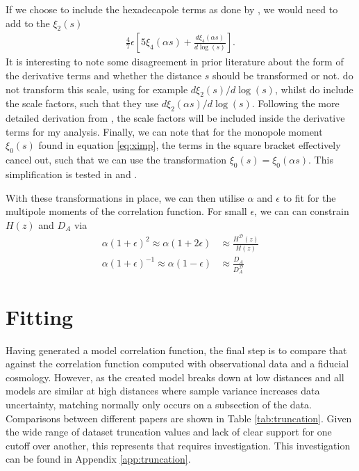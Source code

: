 \documentclass[titlesmallcaps, examinerscopy, copyrightpage]{uqthesis}
\begin{document}
If we choose to include the hexadecapole terms as done by \citet{XuCuesta2013}, we would need to add to the $\xi_2(s)$ 
\begin{align}
\frac{4}{7}\epsilon \left[ 5 \xi_4 (\alpha s) + \frac{d \xi_4(\alpha s)}{d \log(s)} \right].
\end{align}
It is interesting to note some disagreement in prior literature about the form of the derivative terms and whether the distance $s$ should be transformed or not. \citet{KazinSanchezBlanton2012} do not transform this scale, using for example $d\xi_2(s)/d\log(s)$, whilst \citet{XuCuesta2013} do include the scale factors, such that they use $d\xi_2(\alpha s) / d\log(s)$. Following the more detailed derivation from \citet{XuCuesta2013}, the scale factors will be included inside the derivative terms for my analysis. Finally, we can note that for the monopole moment $\xi_0(s)$ found in equation \eqref{eq:ximp}, the terms in the square bracket effectively cancel out, such that we can use the transformation $\xi_0(s) = \xi_0(\alpha s)$. This simplification is tested in \citet{Sanchez2009} and \citet{EisensteinZehavi2005}.

With these transformations in place, we can then utilise $\alpha$ and $\epsilon$ to fit for the multipole moments of the correlation function. For small $\epsilon$, we can can constrain $H(z)$ and $D_A$ via
\begin{align}
\alpha(1 + \epsilon)^2 \approx \alpha(1 + 2\epsilon) &\approx \frac{H^\mathcal{D}(z)}{H(z)} \label{eq:alpha1}\\
\alpha(1 + \epsilon)^{-1} \approx \alpha(1 - \epsilon) &\approx \frac{D_A}{D_A^\mathcal{D}} \label{eq:alpha2}
\end{align}



\newpage
\section{Fitting} \label{sec:trunc}

Having generated a model correlation function, the final step is to compare that against the correlation function computed with observational data and a fiducial cosmology. However, as the created model breaks down at low distances and all models are similar at high distances where sample variance increases data uncertainty, matching normally only occurs on a subsection of the data. Comparisons between different papers are shown in Table \ref{tab:truncation}. Given the wide range of dataset truncation values and lack of clear support for one cutoff over another, this represents that requires investigation. This investigation can be found in Appendix \ref{app:truncation}.
\end{document}
